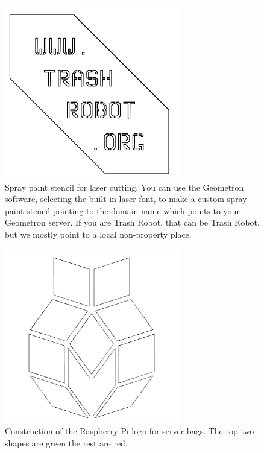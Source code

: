 \begin{figure}
	\centering
	\includegraphics[width=3in]{figures/actiongeometry/stencil.png}
	\caption[stencil]
	{Spray paint stencil for laser cutting. You can use the Geometron software, selecting the built in laser font, to make a custom spray paint stencil pointing to the domain name which points to your Geometron server.  If you are Trash Robot, that can be Trash Robot, but we mostly point to a local non-property place.}
\end{figure}


\begin{figure}
	\centering
	\includegraphics[width=3in]{figures/actiongeometry/pilogo.png}
	\caption[pilogo]
	{Construction of the Raspberry Pi logo for server bags. The top two shapes are green the rest are red.}
\end{figure}


